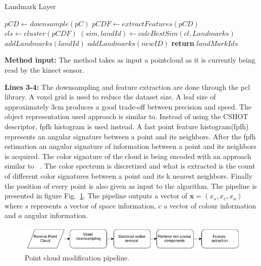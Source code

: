 \documentclass[twoside,hidelinks]{article}
\begin{document}
\begin{algorithm}
  \caption{Landmark Layer}\label{euclid}
  \begin{algorithmic}[1]
      \State $pCD \gets downsample(pC)$ 
      \State $pCDF \gets extractFeatures(pCD)$
      \State $cls \gets cluster(pCDF)$  
	      \State $ (sim, landId) \gets calcBestSim(cl, Landmarks) $
			   \State $ addLandmarks(landId)$
			\Else 
			   \State $addLandmarks(newID)$
			\EndIf
      \EndFor
      \State \textbf{return} $ landMarkIds$
    \EndProcedure
  \end{algorithmic}
\end{algorithm}


\textbf{Method input:} The method takes as input a pointcloud as it is currently being read by the kinect sensor.

\textbf{Lines 3-4:} The downsampling and feature extraction are done through the pcl\cite{pcl} library. A voxel grid is used to reduce the dataset size. A leaf size of approximately 3cm produces a good trade-off between precision and speed. The object representation used approach is similar to\cite{objectpointSLAM}. Instead of using the CSHOT descriptor, fpfh\cite{fpfh} histogram is used instead. A fast point feature histogram(fpfh) represents an angular signature between a point and its neighbors. After the fpfh estimation an angular signature of information between a point and its neighbors is acquired. The color signature of the cloud is being encoded with an approach similar to ~\cite{smcddp}. The color spectrum is discretized and what is extracted is the count of different color signatures between a point and its k nearest neighbors. Finally the position of every point is also given as input to the algorithm. The pipeline is presented in figure Fig.~\ref{pcl:mod}. The pipeline outputs a vector of $ \textbf{x} = (x_s, x_c, x_a) $  where $s$ represents a vector of space information, $c$ a vector of colour information and $a$ angular information. 

\begin{figure}[ht!]
  \centering
    \includegraphics[width=1\textwidth]{Basic}
  \caption{Point cloud modification pipeline.}
  \label{pcl:mod}
\end{figure}
\end{document}
